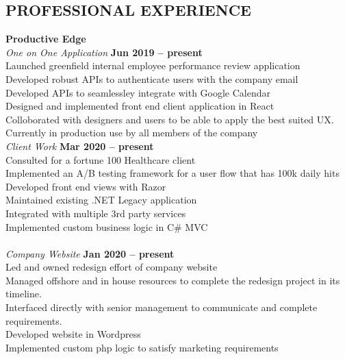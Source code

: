\documentclass[margin,line]{resume}
\begin{document}
\begin{resume}
\sectionline

    \section{\mysidestyle \textbf{\large{P}\small{ROFESSIONAL} \large{E}\small{XPERIENCE}}}

    \textbf{\listing Productive Edge} \vspace{2mm}\\\vspace{1mm}%
    \textsl{One on One Application} \hfill \textbf{Jun 2019 -- present}\\
    Launched greenfield internal employee performance review application\\
    Developed  robust APIs to authenticate users with the company email\\
    Developed APIs to seamlessley integrate with Google Calendar\\
    Designed and implemented front end client application in React\\
    Colloborated with designers and users to be able to apply the best suited UX.\\
    Currently in production use by all members of the company
    \textbf{\listing} \vspace{2mm}\\\vspace{1mm}%
    \textsl{Client Work} \hfill \textbf{Mar 2020 -- present}\\
    Consulted for a fortune 100 Healthcare client \\
    Implemented an A/B testing framework for a user flow that has 100k daily hits\\
    Developed front end views with Razor\\
    Maintained existing .NET Legacy application\\
    Integrated with multiple 3rd party services\\ 
    Implemented custom business logic in C\# MVC\\
     \textbf{\listing} \vspace{0mm}\\\vspace{1mm}%
    \textsl{Company Website} \hfill \textbf{Jan 2020 -- present}\\
    Led and owned redesign effort of company website\\
    Managed offshore and in house resources to complete the redesign project in its timeline.\\
    Interfaced directly with senior management to communicate and complete requirements.\\
    Developed website in Wordpress\\
    Implemented custom php logic to satisfy marketing requirements\\


\end{resume}
\end{document}
